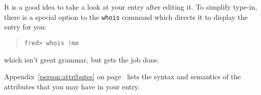 It is a good idea to take a look at your entry after editing it.
To simplify type-in,
there is a special option to the \verb"whois" command which directs it to
display the entry for you:
\begin{quote}\small\begin{verbatim}
fred> whois !me
\end{verbatim}
\end{quote}
which isn't great grammar, but gets the job done.

Appendix~\ref{person:attributes} on page~\pageref{person:attributes} lists the
syntax and semantics of the attributes that you may have in your entry.
